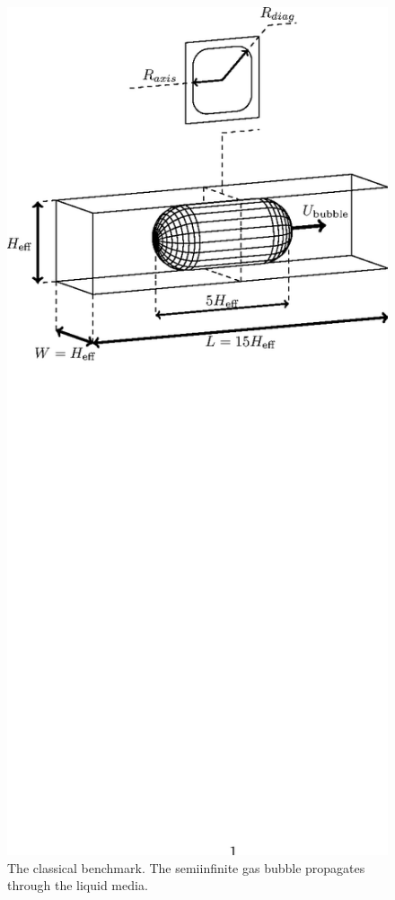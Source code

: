 \documentclass{article}
\begin{document}
\begin{figure}
\includegraphics*[bb=152 480 410 713,width=\textwidth]{Figures/benchmark_lbm.eps}
\caption{The classical benchmark. The semiinfinite gas bubble
propagates through the liquid media. \label{fig:lbm:benchmark}}
\end{figure}
\end{document}

